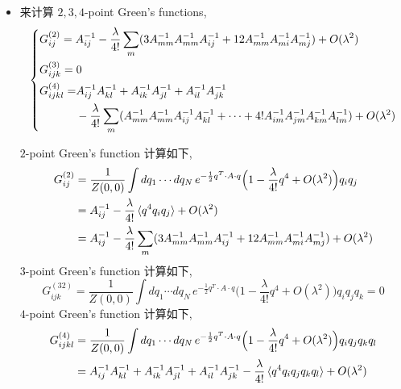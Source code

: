 \begin{itemize}
	\item 来计算 $2, 3, 4$-point Green's functions,
	\begin{equation}
		\begin{dcases}
			G^{(2)}_{i j} = A^{- 1}_{i j} - \frac{\lambda}{4!} \sum_m (3 A^{- 1}_{m m} A^{- 1}_{m m} A^{- 1}_{i j} + 12 A^{- 1}_{m m} A^{- 1}_{m i} A^{- 1}_{m j}) + O(\lambda^2) \\
			G^{(3)}_{i j k} = 0 \\
			\begin{aligned}
				G^{(4)}_{i j k l} =& A^{- 1}_{i j} A^{- 1}_{k l} + A^{- 1}_{i k} A^{- 1}_{j l} + A^{- 1}_{i l} A^{- 1}_{j k} \\
				& - \frac{\lambda}{4!} \sum_m (A^{- 1}_{m m} A^{- 1}_{m m} A^{- 1}_{i j} A^{- 1}_{k l} + \cdots + 4! A^{- 1}_{i m} A^{- 1}_{j m} A^{- 1}_{k m} A^{- 1}_{l m}) + O(\lambda^2)
			\end{aligned}
		\end{dcases}
	\end{equation}
	
	\begin{tcolorbox}[title=calculation:]
		$2$-point Green's function 计算如下,
		\begin{align}
			G^{(2)}_{i j} &= \frac{1}{Z(0, 0)} \int dq_1 \cdots dq_N \, e^{- \frac{1}{2} q^T \cdot A \cdot q} \Big( 1 - \frac{\lambda}{4!} q^4 + O(\lambda^2) \Big) q_i q_j \notag \\
			&= A^{- 1}_{i j} - \frac{\lambda}{4!} \braket{q^4 q_i q_j} + O(\lambda^2) \notag \\
			&= A^{- 1}_{i j} - \frac{\lambda}{4!} \sum_m (3 A^{- 1}_{m m} A^{- 1}_{m m} A^{- 1}_{i j} + 12 A^{- 1}_{m m} A^{- 1}_{m i} A^{- 1}_{m j}) + O(\lambda^2)
		\end{align}
		$3$-point Green's function 计算如下,
		\begin{equation}
			G^{(32)}_{i j k} = \frac{1}{Z(0, 0)} \int dq_1 \cdots dq_N \, e^{- \frac{1}{2} q^T \cdot A \cdot q} \Big( 1 - \frac{\lambda}{4!} q^4 + O(\lambda^2) \Big) q_i q_j q_k = 0
		\end{equation}
		$4$-point Green's function 计算如下,
		\begin{align}
			G^{(4)}_{i j k l} &= \frac{1}{Z(0, 0)} \int dq_1 \cdots dq_N \, e^{- \frac{1}{2} q^T \cdot A \cdot q} \Big( 1 - \frac{\lambda}{4!} q^4 + O(\lambda^2) \Big) q_i q_j q_k q_l \notag \\
			&= A^{- 1}_{i j} A^{- 1}_{k l} + A^{- 1}_{i k} A^{- 1}_{j l} + A^{- 1}_{i l} A^{- 1}_{j k} - \frac{\lambda}{4!} \braket{q^4 q_i q_j q_k q_l} + O(\lambda^2)
		\end{align}
	\end{tcolorbox}
\end{itemize}


